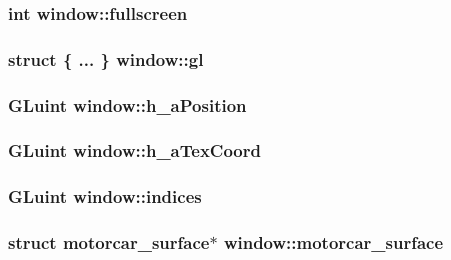 \hypertarget{structwindow_a8da44798a9e1feb7ed3fbd18ec3a28b6}{
\subsubsection[{fullscreen}]{\setlength{\rightskip}{0pt plus 5cm}int window\-::fullscreen}}\label{structwindow_a8da44798a9e1feb7ed3fbd18ec3a28b6}
\hypertarget{structwindow_a6975a930e9a3c166f8201fc4ef5e7728}{
\subsubsection[{gl}]{\setlength{\rightskip}{0pt plus 5cm}struct \{ ... \}   window\-::gl}}\label{structwindow_a6975a930e9a3c166f8201fc4ef5e7728}
\hypertarget{structwindow_aad6fbe6b4e8c274d5e9d643fb2f83a85}{
\subsubsection[{h\-\_\-a\-Position}]{\setlength{\rightskip}{0pt plus 5cm}G\-Luint window\-::h\-\_\-a\-Position}}\label{structwindow_aad6fbe6b4e8c274d5e9d643fb2f83a85}
\hypertarget{structwindow_a1ed9df968b031386245164482467fd38}{
\subsubsection[{h\-\_\-a\-Tex\-Coord}]{\setlength{\rightskip}{0pt plus 5cm}G\-Luint window\-::h\-\_\-a\-Tex\-Coord}}\label{structwindow_a1ed9df968b031386245164482467fd38}
\hypertarget{structwindow_a669d3d1d362ac34ddc5dfcc7dd4bc258}{
\subsubsection[{indices}]{\setlength{\rightskip}{0pt plus 5cm}G\-Luint window\-::indices}}\label{structwindow_a669d3d1d362ac34ddc5dfcc7dd4bc258}
\hypertarget{structwindow_a0be16829aad611ea0be83bd985b07302}{
\subsubsection[{motorcar\-\_\-surface}]{\setlength{\rightskip}{0pt plus 5cm}struct motorcar\-\_\-surface$\ast$ window\-::motorcar\-\_\-surface}}\label{structwindow_a0be16829aad611ea0be83bd985b07302}
